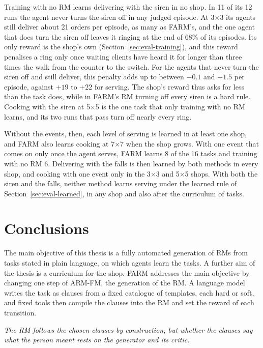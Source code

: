 \documentclass[11pt,english,listoffigures,listoftables]{tfgetsinf}
\newcommand{\keyidea}[1]{\par\smallskip\noindent\hspace*{0.6em}{\color{gray!55}\vrule width 1.5pt}\hspace{8pt}\parbox[t]{\dimexpr\linewidth-0.6em-9.5pt\relax}{\itshape #1}\par\smallskip}  %
\newcommand{\gain}[1]{\textcolor{green!40!black}{\bfseries\boldmath #1}}  %
\newcommand{\loss}[1]{\textcolor{red!60!black}{\bfseries\boldmath #1}}  %
\begin{document}
Training with no RM learns delivering with the siren in no shop. In 11 of its 12 runs the agent never turns the siren off in any judged episode. At 3$\times$3 its agents still deliver about 21 orders per episode, as many as FARM's, and the one agent that does turn the siren off leaves it ringing at the end of 68\% of its episodes. Its only reward is the shop's own (Section~\ref{sec:eval-training}), and this reward penalises a ring only once waiting clients have heard it for longer than three times the walk from the counter to the switch. For the agents that never turn the siren off and still deliver, this penalty adds up to between \loss{$-0.1$} and \loss{$-1.5$} per episode, against \gain{$+19$} to \gain{$+22$} for serving. The shop's reward thus asks for less than the task does, while in FARM's RM turning off every siren is a hard rule. Cooking with the siren at 5$\times$5 is the one task that only training with no RM learns, and its two runs that pass turn off nearly every ring.

Without the events, then, each level of serving is learned in at least one shop, and FARM also learns cooking at 7$\times$7 when the shop grows. With one event that comes on only once the agent serves, FARM learns 8 of the 16 tasks and training with no RM 6. Delivering with the falls is then learned by both methods in every shop, and cooking with one event only in the 3$\times$3 and 5$\times$5 shops. With both the siren and the falls, neither method learns serving under the learned rule of Section~\ref{sec:eval-learned}, in any shop and also after the curriculum of tasks.

\chapter{Conclusions}
\label{chap:conclusions}

The main objective of this thesis is a fully automated generation of RMs from tasks stated in plain language, on which agents learn the tasks. A further aim of the thesis is a curriculum for the shop. FARM addresses the main objective by changing one step of ARM-FM, the generation of the RM. A language model writes the task as clauses from a fixed catalogue of templates, each hard or soft, and fixed tools then compile the clauses into the RM and set the reward of each transition.

\keyidea{The RM follows the chosen clauses by construction, but whether the clauses say what the person meant rests on the generator and its critic.}
\end{document}
